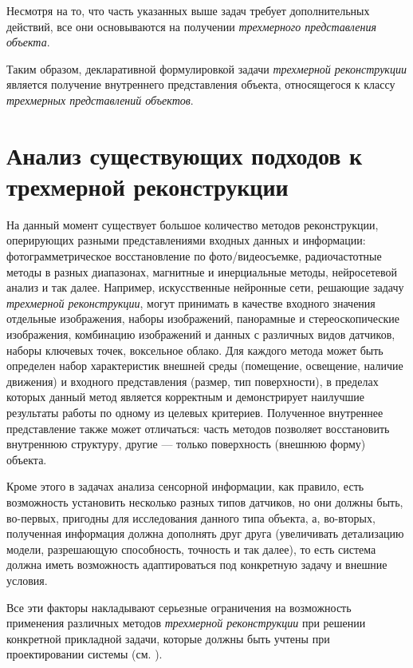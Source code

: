 Несмотря на то, что часть указанных выше задач требует дополнительных действий, все они основываются на получении \textit{трехмерного представления объекта}.

Таким образом, декларативной формулировкой задачи \textit{трехмерной реконструкции} является получение внутреннего представления объекта, относящегося к классу \textit{трехмерных представлений объектов}.

\section{Анализ существующих подходов к трехмерной реконструкции}
\label{sec_3d_models_analysis}

На данный момент существует большое количество методов реконструкции, оперирующих разными представлениями входных данных и информации: фотограмметрическое восстановление по фото/видеосъемке, радиочастотные методы в разных диапазонах, магнитные и инерциальные методы, нейросетевой анализ и так далее. Например, искусственные нейронные сети, решающие задачу \textit{трехмерной реконструкции}, могут принимать в качестве входного значения отдельные изображения, наборы изображений, панорамные и стереоскопические изображения, комбинацию изображений и данных с различных видов датчиков, наборы ключевых точек, воксельное облако. Для каждого метода может быть определен набор характеристик внешней среды (помещение, освещение, наличие движения) и входного представления (размер, тип поверхности), в пределах которых данный метод является корректным и демонстрирует наилучшие результаты работы по одному из целевых критериев. Полученное внутреннее представление также может отличаться: часть методов позволяет восстановить внутреннюю структуру, другие --- только поверхность (внешнюю форму) объекта.

Кроме этого в задачах анализа сенсорной информации, как правило, есть возможность установить несколько разных типов датчиков, но они должны быть, во-первых, пригодны для исследования данного типа объекта, а, во-вторых, полученная информация должна дополнять друг друга (увеличивать детализацию модели, разрешающую способность, точность и так далее), то есть система должна иметь возможность адаптироваться под конкретную задачу и внешние условия.

Все эти факторы накладывают серьезные ограничения на возможность применения различных методов \textit{трехмерной реконструкции} при решении конкретной прикладной задачи, которые должны быть учтены при проектировании системы (см. ).

